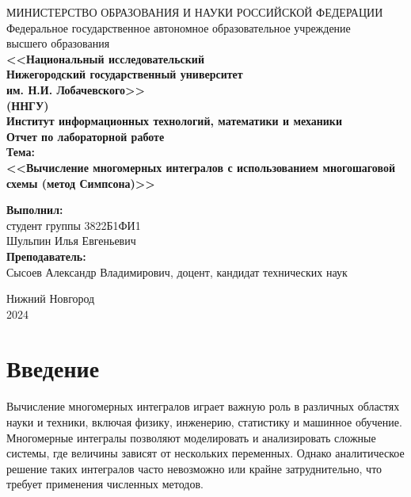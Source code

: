 \documentclass[12pt,a4paper]{article}
\begin{document}
\begin{center} 
МИНИСТЕРСТВО ОБРАЗОВАНИЯ И НАУКИ РОССИЙСКОЙ ФЕДЕРАЦИИ \\
Федеральное государственное автономное образовательное учреждение  \\
высшего образования\\ \textbf{<<Национальный исследовательский \\ Нижегородский государственный университет \\
им. Н.И. Лобачевского>>}\\
\textbf{(ННГУ)}\\[0.5cm]
\textbf{Институт информационных технологий, математики и механики}\\[4.5cm]

\textbf{\large Отчет по лабораторной работе} \\[0.6cm] %
\textbf{Тема:}\\
  \textbf{\large <<Вычисление многомерных интегралов с использованием многошаговой схемы (метод Симпсона)>>}\\[5.0cm]
\begin{flushright}
 \begin{minipage}{0.40\textwidth} %
 \begin{flushleft} %
  \textbf{Выполнил:}\\[0.1cm]
  студент группы 3822Б1ФИ1 \\
  Шульпин Илья Евгеньевич  \\[1.0cm]
  \textbf{Преподаватель:}\\[0.1cm]
  Сысоев Александр Владимирович, доцент, кандидат технических наук  \\
 \end{flushleft} %
 \end{minipage} %
\end{flushright}
 \vfill 

  Нижний Новгород \\
 2024

 \thispagestyle{empty} 

\end{center}

\newpage
\section*{Введение}
\indent Вычисление многомерных интегралов играет важную роль в различных областях науки и техники, включая физику, инженерию, статистику и машинное обучение. Многомерные интегралы позволяют моделировать и анализировать сложные системы, где величины зависят от нескольких переменных. Однако аналитическое решение таких интегралов часто невозможно или крайне затруднительно, что требует применения численных методов.
\end{document}
